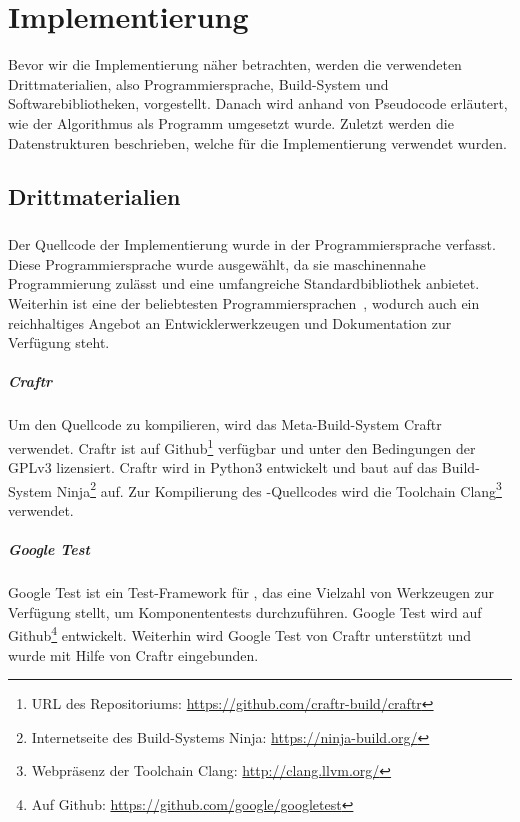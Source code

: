 
\chapter{Implementierung}\label{chapter:implementierung}
Bevor wir die Implementierung näher betrachten, werden die verwendeten Drittmaterialien, also Programmiersprache, Build-System und Softwarebibliotheken, vorgestellt.
Danach wird anhand von Pseudocode erläutert, wie der Algorithmus als Programm umgesetzt wurde. 
Zuletzt werden die Datenstrukturen beschrieben, welche für die Implementierung verwendet wurden.

\section{Drittmaterialien}
\paragraph{\Cpp}
Der Quellcode der Implementierung wurde in der Programmiersprache \Cpp{} verfasst.
Diese Programmiersprache wurde ausgewählt, da sie maschinennahe Programmierung zulässt und eine umfangreiche Standardbibliothek anbietet.
Weiterhin ist \Cpp{} eine der beliebtesten Programmiersprachen~\parencite{TIO17}, wodurch auch ein reichhaltiges Angebot an Entwicklerwerkzeugen und Dokumentation zur Verfügung steht.

\paragraph{Craftr}
Um den Quellcode zu kompilieren, wird das Meta-Build-System Craftr verwendet.
Craftr ist auf Github\footnote{URL des Repositoriums: \url{https://github.com/craftr-build/craftr}} verfügbar und unter den Bedingungen der GPLv3 lizensiert.
Craftr wird in Python3 entwickelt und baut auf das Build-System Ninja\footnote{Internetseite des Build-Systems Ninja: \url{https://ninja-build.org/}} auf. 
Zur Kompilierung des \Cpp\hyp Quellcodes wird die Toolchain Clang\footnote{Webpräsenz der Toolchain Clang: \url{http://clang.llvm.org/}} verwendet.

\paragraph{Google Test}
Google Test ist ein Test-Framework für \Cpp, das eine Vielzahl von Werkzeugen zur Verfügung stellt, um Komponententests durchzuführen. 
Google Test wird auf Github\footnote{Auf Github: \url{https://github.com/google/googletest}} entwickelt.
Weiterhin wird Google Test von Craftr unterstützt und wurde mit Hilfe von Craftr eingebunden.

